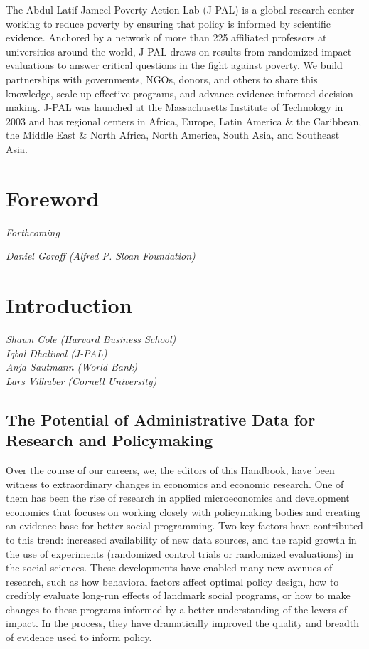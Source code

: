 \documentclass[
]{book}
\begin{document}
The Abdul Latif Jameel Poverty Action Lab (J-PAL) is a global research center working to reduce poverty by ensuring that policy is informed by scientific evidence. Anchored by a network of more than 225 affiliated professors at universities around the world, J-PAL draws on results from randomized impact evaluations to answer critical questions in the fight against poverty. We build partnerships with governments, NGOs, donors, and others to share this knowledge, scale up effective programs, and advance evidence-informed decision-making. J-PAL was launched at the Massachusetts Institute of Technology in 2003 and has regional centers in Africa, Europe, Latin America \& the Caribbean, the Middle East \& North Africa, North America, South Asia, and Southeast Asia.

\hypertarget{foreword}{%
\chapter*{Foreword}\label{foreword}}

\emph{Forthcoming}

\emph{Daniel Goroff (Alfred P. Sloan Foundation)}

\hypertarget{intro}{%
\chapter{Introduction}\label{intro}}

\emph{Shawn Cole (Harvard Business School)}\\
\emph{Iqbal Dhaliwal (J-PAL)}\\
\emph{Anja Sautmann (World Bank)}\\
\emph{Lars Vilhuber (Cornell University)}

\hypertarget{the-potential-of-administrative-data-for-research-and-policymaking}{%
\section{The Potential of Administrative Data for Research and Policymaking}\label{the-potential-of-administrative-data-for-research-and-policymaking}}

Over the course of our careers, we, the editors of this Handbook, have been witness to extraordinary changes in economics and economic research. One of them has been the rise of research in applied microeconomics and development economics that focuses on working closely with policymaking bodies and creating an evidence base for better social programming. Two key factors have contributed to this trend: increased availability of new data sources, and the rapid growth in the use of experiments (randomized control trials or randomized evaluations) in the social sciences. These developments have enabled many new avenues of research, such as how behavioral factors affect optimal policy design, how to credibly evaluate long-run effects of landmark social programs, or how to make changes to these programs informed by a better understanding of the levers of impact. In the process, they have dramatically improved the quality and breadth of evidence used to inform policy.
\end{document}
